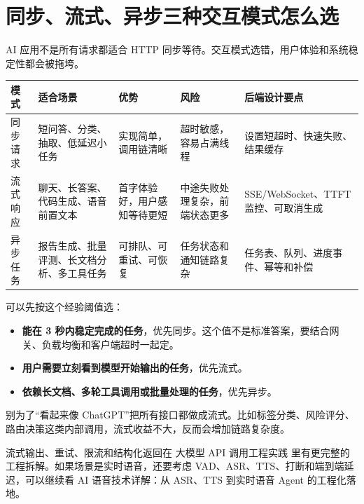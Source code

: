 \documentclass[9pt,a4paper,twocolumn]{ctexart}
\begin{document}
\section*{同步、流式、异步三种交互模式怎么选}


AI 应用不是所有请求都适合 HTTP 同步等待。交互模式选错，用户体验和系统稳定性都会被拖垮。


{\footnotesize
\begin{tabular}{|p{}|p{}|p{}|p{}|p{}|}
\hline
\textbf{模式} & \textbf{适合场景} & \textbf{优势} & \textbf{风险} & \textbf{后端设计要点} \\
\hline
同步请求 & 短问答、分类、抽取、低延迟小任务 & 实现简单，调用链清晰 & 超时敏感，容易占满线程 & 设置短超时、快速失败、结果缓存 \\
\hline
流式响应 & 聊天、长答案、代码生成、语音前置文本 & 首字体验好，用户感知等待更短 & 中途失败处理复杂，前端状态更多 & SSE/WebSocket、TTFT 监控、可取消生成 \\
\hline
异步任务 & 报告生成、批量评测、长文档分析、多工具任务 & 可排队、可重试、可恢复 & 任务状态和通知链路复杂 & 任务表、队列、进度事件、幂等和补偿 \\
\hline
\end{tabular}
}



可以先按这个经验阈值选：


\begin{itemize}[itemsep=1pt, topsep=2pt]
  \item \textbf{能在 3 秒内稳定完成的任务}，优先同步。这个值不是标准答案，要结合网关、负载均衡和客户端超时一起定。
  \item \textbf{用户需要立刻看到模型开始输出的任务}，优先流式。
  \item \textbf{依赖长文档、多轮工具调用或批量处理的任务}，优先异步。
\end{itemize}


别为了“看起来像 ChatGPT”把所有接口都做成流式。比如标签分类、风险评分、路由决策这类内部调用，流式收益不大，反而会增加链路复杂度。



流式输出、重试、限流和结构化返回在 大模型 API 调用工程实践 里有更完整的工程拆解。如果场景是实时语音，还要考虑 VAD、ASR、TTS、打断和端到端延迟，可以继续看 AI 语音技术详解：从 ASR、TTS 到实时语音 Agent 的工程化落地。
\end{document}
